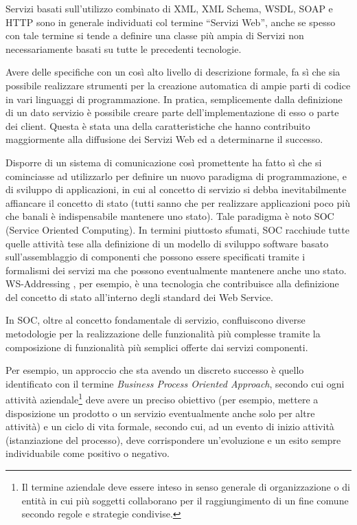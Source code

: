 Servizi basati sull'utilizzo combinato di XML, XML Schema, WSDL, SOAP e HTTP
sono in generale individuati col termine ``Servizi Web'', anche se spesso con
tale termine si tende a definire una classe più ampia di Servizi non necessariamente basati su tutte le
precedenti tecnologie.

Avere delle specifiche con un così alto livello di descrizione formale, fa sì
che sia possibile realizzare strumenti per la creazione
automatica di ampie parti di codice in vari linguaggi di programmazione. In
pratica, semplicemente dalla definizione di un dato servizio è possibile creare
parte dell'implementazione di esso o parte dei client. Questa è stata una della
caratteristiche che hanno contribuito maggiormente alla diffusione dei Servizi
Web ed a determinarne il successo.

Disporre di un sistema di comunicazione così promettente ha fatto sì che si
cominciasse ad utilizzarlo per definire un nuovo paradigma di programmazione, 
e di sviluppo di applicazioni, in cui al concetto di servizio si debba
inevitabilmente affiancare il concetto di stato (tutti sanno che per
realizzare applicazioni poco più che banali è indispensabile mantenere uno
stato). Tale paradigma è noto SOC (Service Oriented Computing).
In termini piuttosto sfumati, SOC racchiude tutte quelle attività tese alla
definizione di un modello di sviluppo software basato sull'assemblaggio di componenti che possono essere
specificati tramite i formalismi dei servizi ma che possono eventualmente
mantenere anche uno stato. WS-Addressing \cite{WS-Addressing}, per esempio, è
una tecnologia che contribuisce alla definizione del concetto di stato all'interno degli standard
dei Web Service.

In SOC, oltre al concetto fondamentale di servizio, confluiscono diverse
metodologie per la realizzazione delle funzionalità più complesse tramite la
composizione di funzionalità più semplici offerte dai servizi componenti.

Per esempio, un approccio che sta avendo un discreto successo è quello
identificato con il termine \emph{Business Process Oriented Approach}, secondo
cui ogni attività aziendale\footnote{Il termine aziendale deve essere inteso in
senso generale di organizzazione o di entità in cui più soggetti collaborano
per il raggiungimento di un fine comune secondo regole e strategie condivise.} deve
avere un preciso obiettivo (per esempio, mettere a disposizione un prodotto o un
servizio eventualmente anche solo per altre attività) e un ciclo di vita
formale, secondo cui, ad un evento di inizio attività (istanziazione del
processo), deve corrispondere un'evoluzione e un esito sempre individuabile
come positivo o negativo.

